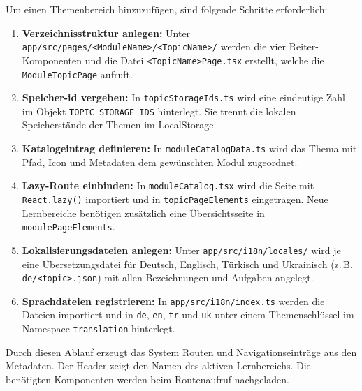 Um einen Themenbereich hinzuzufügen, sind folgende Schritte erforderlich:
\begin{enumerate}
  \item \textbf{Verzeichnisstruktur anlegen:} Unter \verb|app/src/pages/<ModuleName>/<TopicName>/| werden die vier Reiter-Komponenten und die Datei \verb|<TopicName>Page.tsx| erstellt, welche die \verb|ModuleTopicPage| aufruft.
  \item \textbf{Speicher-\gls{id} vergeben:} In \texttt{topicStorageIds.ts} wird eine eindeutige Zahl im Objekt \texttt{TOPIC\_STORAGE\_IDS} hinterlegt. Sie trennt die lokalen Speicherstände der Themen im LocalStorage.
  \item \textbf{Katalogeintrag definieren:} In \verb|moduleCatalogData.ts| wird das Thema mit Pfad, Icon und Metadaten dem gewünschten Modul zugeordnet.
  \item \textbf{Lazy-Route einbinden:} In \verb|moduleCatalog.tsx| wird die Seite mit \verb|React.lazy()| importiert und in \verb|topicPageElements| eingetragen. Neue Lernbereiche benötigen zusätzlich eine Übersichtsseite in \verb|modulePageElements|.
  \item \textbf{Lokalisierungsdateien anlegen:} Unter \texttt{app/src/i18n/locales/} wird je eine Übersetzungsdatei für Deutsch, Englisch, Türkisch und Ukrainisch (z.\,B. \texttt{de/<topic>.json}) mit allen Bezeichnungen und Aufgaben angelegt.
  \item \textbf{Sprachdateien registrieren:} In \verb|app/src/i18n/index.ts| werden die Dateien importiert und in \verb|de|, \verb|en|, \verb|tr| und \verb|uk| unter einem Themenschlüssel im Namespace \verb|translation| hinterlegt.
\end{enumerate}

Durch diesen Ablauf erzeugt das System Routen und Navigationseinträge aus den Metadaten. Der Header zeigt den Namen des aktiven Lernbereichs. Die benötigten Komponenten werden beim Routenaufruf nachgeladen. 